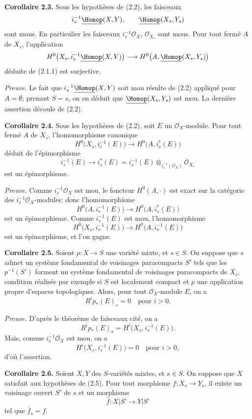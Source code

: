 \documentclass[11pt]{article}
\providecommand{\cO}{\mathcal O}
\begin{document}
\textbf{Corollaire 2.3.} Sous les hypothèses de (2.2), les faisceaux
\[
  i_s^{-1}\underline{\Homop}(X,Y),\qquad \underline{\Homop}(X_s,Y_s)
\]
sont mous. En particulier les faisceaux $i_s^{-1}\cO_X$, $\cO_{X_s}$ sont mous. Pour tout fermé $A$ de $X_s$, l'application
\[
  H^0\bigl(X_s,i_s^{-1}\underline{\Homop}(X,Y)\bigr)
  \longrightarrow
  H^0\bigl(A,\underline{\Homop}(X_s,Y_s)\bigr)
\]
déduite de (2.1.1) est surjective.

\emph{Preuve.} Le fait que $i_s^{-1}\underline{\Homop}(X,Y)$ soit mou résulte de (2.2) appliqué pour $A=\emptyset$; prenant $S=s$, on en déduit que $\underline{\Homop}(X_s,Y_s)$ est mou. La dernière assertion découle de (2.2).

\textbf{Corollaire 2.4.} Sous les hypothèses de (2.2), soit $E$ un $\cO_X$-module. Pour tout fermé $A$ de $X_s$, l'homomorphisme canonique
\[
  H^0\bigl(X_s,i_s^{-1}(E)\bigr)
  \longrightarrow
  H^0\bigl(A,i_s^*(E)\bigr)
\]
déduit de l'épimorphisme
\[
  i_s^{-1}(E)\longrightarrow i_s^*(E)
  =i_s^{-1}(E)\otimes_{i_s^{-1}(\cO_X)}\cO_{X_s}
\]
est un épimorphisme.

\emph{Preuve.} Comme $i_s^{-1}\cO_X$ est mou, le foncteur $H^0(A,\cdot)$ est exact sur la catégorie des $i_s^{-1}\cO_X$-modules; donc l'homomorphisme
\[
  H^0\bigl(A,i_s^{-1}(E)\bigr)
  \longrightarrow
  H^0\bigl(A,i_s^*(E)\bigr)
\]
est un épimorphisme. Comme $i_s^{-1}(E)$ est mou, l'homomorphisme
\[
  H^0\bigl(X_s,i_s^{-1}(E)\bigr)
  \longrightarrow
  H^0\bigl(A,i_s^{-1}(E)\bigr)
\]
est un épimorphisme, et l'on gagne.

\textbf{Corollaire 2.5.} Soient $p:X\to S$ une variété mixte, et $s\in S$. On suppose que $s$ admet un système fondamental de voisinages paracompacts $S'$ tels que les $p^{-1}(S')$ forment un système fondamental de voisinages paracompacts de $X_s$, condition réalisée par exemple si $S$ est localement compact et $p$ une application propre d'espaces topologiques. Alors, pour tout $\cO_X$-module $E$, on a
\[
  R^i p_*(E)_s=0 \quad \text{pour } i>0.
\]

\emph{Preuve.} D'après le théorème de faisceaux cité, on a
\[
  R^i p_*(E)_s=H^i\bigl(X_s,i_s^{-1}(E)\bigr).
\]
Mais, comme $i_s^{-1}\cO_X$ est mou, on a
\[
  H^i\bigl(X_s,i_s^{-1}(E)\bigr)=0\quad \text{pour } i>0,
\]
d'où l'assertion.

\textbf{Corollaire 2.6.} Soient $X,Y$ des $S$-variétés mixtes, et $s\in S$. On suppose que $X$ satisfait aux hypothèses de (2.5). Pour tout morphisme $f:X_s\to Y_s$, il existe un voisinage ouvert $S'$ de $s$ et un morphisme
\[
  \bar f:X|S'\longrightarrow Y|S'
\]
tel que $\bar f_s=f$.
\end{document}
